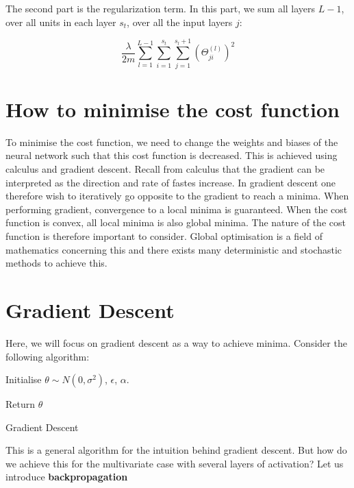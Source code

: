 The second part is the regularization term. In this part, we sum all layers $L-1$, over all units in each layer $s_t$, over all the input layers $j$:

\[
    \frac{\lambda}{2m}\sum_{l=1}^{L-1}\sum_{i=1}^{s_t}\sum_{j=1}^{s_l+1}(\Theta_{ji}^{(l)})^2
\]

\section{How to minimise the cost function}

To minimise the cost function, we need to change the weights and biases of the 
neural network such that this cost function is decreased. This is achieved using
calculus and gradient descent. Recall from calculus that the gradient can be
interpreted as the direction and rate of fastes increase. In gradient descent
one therefore wish to iteratively go opposite to the gradient to reach a minima.
When performing gradient, convergence to a local minima is guaranteed. 
When the cost function is convex, all local minima is also global minima.
The nature of the cost function is therefore important to consider. 
Global optimisation is a field of mathematics concerning this and there exists 
many deterministic and stochastic methods to achieve this.

\section{Gradient Descent}
Here, we will focus on gradient descent as a way to achieve minima. Consider the
following algorithm:

\begin{algorithm}[H]
    \SetAlgoLined
    Initialise $\theta \sim N(0, \sigma^2)$, $\epsilon$, $\alpha$.


    Return $\theta$
    \caption{Gradient Descent}
\end{algorithm}

This is a general algorithm for the intuition behind gradient descent. But how 
do we achieve this for the multivariate case with several layers of activation?
Let us introduce \textbf{backpropagation}

